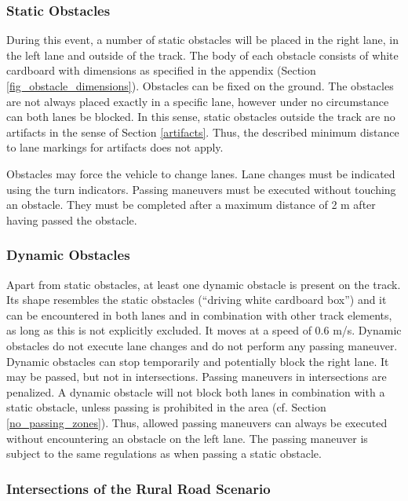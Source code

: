 \subsubsection{Static Obstacles}

During this event, a number of static obstacles will be placed in the right
lane, in the left lane and outside of the track. The body of each obstacle
consists of white cardboard with dimensions as specified in the appendix
(Section \ref{fig_obstacle_dimensions}). Obstacles can be fixed on the ground.
The obstacles are not always placed exactly in a specific lane, however under
no circumstance can both lanes be blocked. In this sense, static obstacles
outside the track are no artifacts in the sense of Section \ref{artifacts}.
Thus, the described minimum distance to lane markings for artifacts does not
apply.

Obstacles may force the vehicle to change lanes. Lane changes must be indicated
using the turn indicators. Passing maneuvers must be executed without touching
an obstacle. They must be completed after a maximum distance of 2 m after
having passed the obstacle.

\subsubsection{Dynamic Obstacles}

Apart from static obstacles, at least one dynamic obstacle is present on the
track. Its shape resembles the static obstacles (“driving white cardboard box”)
and it can be encountered in both lanes and in combination with other track
elements, as long as this is not explicitly excluded. It moves at a speed of
0.6 m/s. Dynamic obstacles do not execute lane changes and do not perform any
passing maneuver. Dynamic obstacles can stop temporarily and potentially block
the right lane. It may be passed, but not in intersections. Passing maneuvers
in intersections are penalized. A dynamic obstacle will not block both lanes in
combination with a static obstacle, unless passing is prohibited in the area
(cf. Section \ref{no_passing_zones}). Thus, allowed passing maneuvers can
always be executed without encountering an obstacle on the left lane. The
passing maneuver is subject to the same regulations as when passing a static
obstacle.

\subsubsection{Intersections of the Rural Road Scenario}
\label{intersection_rural}

